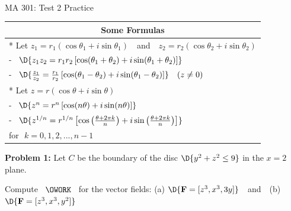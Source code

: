 \documentclass[12pt]{amsart}
\numberwithin{equation}{section}
\begin{document}


$\quad$

\vspace{0.6cm}

\begin{center}
\Large {MA 301:} \Large{Test 2 Practice} \\

\vspace{5.5cm}

	\setlength{\extrarowheight}{0.5cm}
	\begin{tabular}{| p{14cm} |}
		\hline
		\multicolumn{1}{|c|}{{\bf Some Formulas}} \\
		\hline
		 * Let $z_1 = r_1(\cos \theta_1 + i\sin \theta_1)$ \,\, and \,\, $z_2 = r_2(\cos \theta_2 + i\sin \theta_2)$\\
		 \qquad - \, $\D{z_1z_2 = r_1r_2\left[\cos (\theta_1+\theta_2) + i\sin (\theta_1+\theta_2)\right]}$ \\
		 \qquad - \, $\D{\frac{z_1}{z_2} = \frac{r_1}{r_2}\left[\cos (\theta_1-\theta_2) + i\sin (\theta_1-\theta_2)\right]} \quad (z\ne0)$ \\
		 * Let $z = r(\cos \theta + i\sin \theta)$ \\
		 \qquad - \, $\D{z^n = r^n\left[\cos (n\theta) + i\sin (n\theta)\right]}$ \\
		 \qquad - \, $\D{z^{1/n} = r^{1/n}\left[\cos \left(\frac{\theta+2\pi k}{n}\right) + i\sin \left(\frac{\theta+2\pi k}{n}\right)\right]}$ \\
		 \hspace{2.0cm} for \,\,$k=0,1,2,...,n-1$\\
		\hline
	\end{tabular}

\end{center}

\vspace{1.0cm}

\thispagestyle{empty}
\newpage
\thispagestyle{empty}

{\bf Problem 1:} Let $C$ be the boundary of the disc $\D{y^2 + z^2 \le 9}$ in the $x = 2$ plane.  

\vspace{0.2cm}

Compute \, $\OWORK$ \, for the vector fields: (a) $\D{{\bf F} = [z^3, x^3, 3y]}$ \,\, and \,\, (b) $\D{{\bf F} = [z^3, x^3, y^2]}$

\thispagestyle{empty}
\newpage
\thispagestyle{empty}
\end{document}
